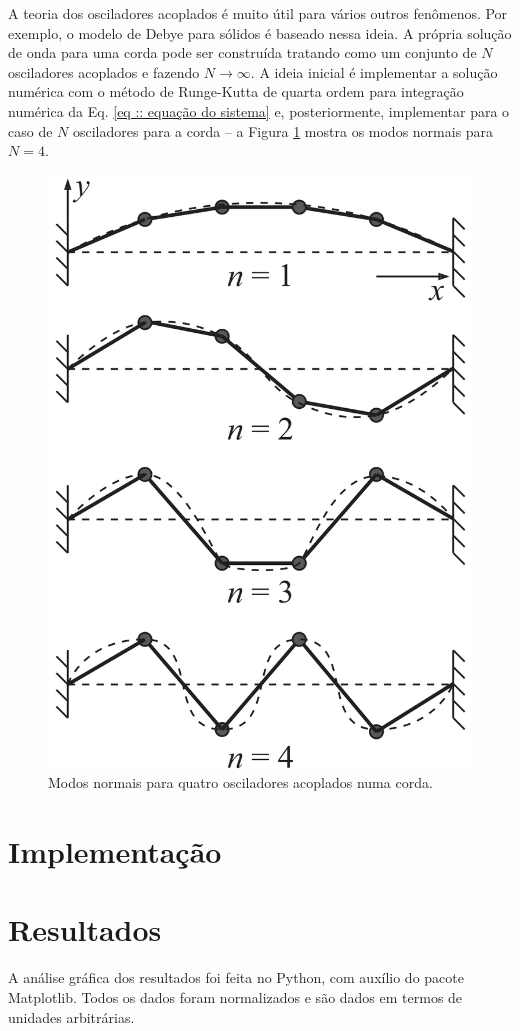 \documentclass[a4paper, 11pt]{article}
\begin{document}
    A teoria dos osciladores acoplados é muito útil para vários outros fenômenos. Por exemplo, o modelo de Debye para sólidos é baseado nessa ideia. A própria solução de onda para uma corda pode ser construída tratando como um conjunto de $N$ osciladores acoplados e fazendo $N\to\infty$. A ideia inicial é implementar a solução numérica com o método de Runge-Kutta de quarta ordem para integração numérica da Eq. \eqref{eq :: equação do sistema} e, posteriormente, implementar para o caso de $N$ osciladores para a corda -- a Figura \ref{figura :: modos normais para quatro osciladores} mostra os modos normais para $N=4$.

    \begin{figure}[h!]
        \centering
        \includegraphics[width=0.6\linewidth]{modos_normais_para_quatro_osciladores.jpg}
        \caption{Modos normais para quatro osciladores acoplados numa corda.
        \label{figura :: modos normais para quatro osciladores}}
    \end{figure}

\newpage
\section{ Implementação }

    
\newpage
\section{ Resultados }

    A análise gráfica dos resultados foi feita no Python, com auxílio do pacote Matplotlib. Todos os dados foram normalizados e são dados em termos de unidades arbitrárias.
    
\end{document}
